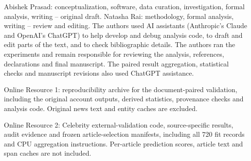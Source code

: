  Abishek Prasad: conceptualization, software, data curation, investigation, formal analysis, writing -- original draft. Natasha Rai: methodology, formal analysis, writing -- review and editing.
 The authors used AI assistants (Anthropic's Claude and OpenAI's ChatGPT) to help develop and debug analysis code, to draft and edit parts of the text, and to check bibliographic details. The authors ran the experiments and remain responsible for reviewing the analysis, references, declarations and final manuscript. The paired result aggregation, statistical checks and manuscript revisions also used ChatGPT assistance.

 Online Resource 1: reproducibility archive for the document-paired validation, including the original account outputs, derived statistics, provenance checks and analysis code. Original news text and entity caches are excluded.

Online Resource 2: Celebrity external-validation code, source-specific results, audit evidence and frozen article-selection manifests, including all 720 fit records and CPU aggregation instructions. Per-article prediction scores, article text and span caches are not included.
